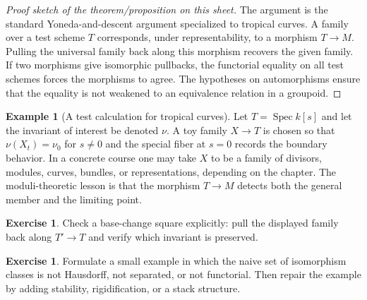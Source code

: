 \documentclass[11pt]{amsart}
\theoremstyle{definition}
\newtheorem{example}[theorem]{Example}
\newtheorem{exercise}[theorem]{Exercise}
\newcommand{\Spec}{\operatorname{Spec}}
\begin{document}
\begin{proof}[Proof sketch of the theorem/proposition on this sheet]
The argument is the standard Yoneda-and-descent argument specialized to tropical curves.  A family over a test scheme $T$ corresponds, under representability, to a morphism $T\to M$.  Pulling the universal family back along this morphism recovers the given family.  If two morphisms give isomorphic pullbacks, the functorial equality on all test schemes forces the morphisms to agree.  The hypotheses on automorphisms ensure that the equality is not weakened to an equivalence relation in a groupoid.
\end{proof}
\begin{example}[A test calculation for tropical curves]
Let $T=\Spec k[s]$ and let the invariant of interest be denoted $\nu$.  A toy family $X\to T$ is chosen so that $\nu(X_t)=\nu_0$ for $s\ne0$ and the special fiber at $s=0$ records the boundary behavior.  In a concrete course one may take $X$ to be a family of divisors, modules, curves, bundles, or representations, depending on the chapter.  The moduli-theoretic lesson is that the morphism $T\to M$ detects both the general member and the limiting point.
\end{example}
\begin{exercise}
Check a base-change square explicitly: pull the displayed family back along $T\prime\to T$ and verify which invariant is preserved.
\end{exercise}
\begin{exercise}
Formulate a small example in which the naive set of isomorphism classes is not Hausdorff, not separated, or not functorial.  Then repair the example by adding stability, rigidification, or a stack structure.
\end{exercise}
\clearpage
\end{document}
